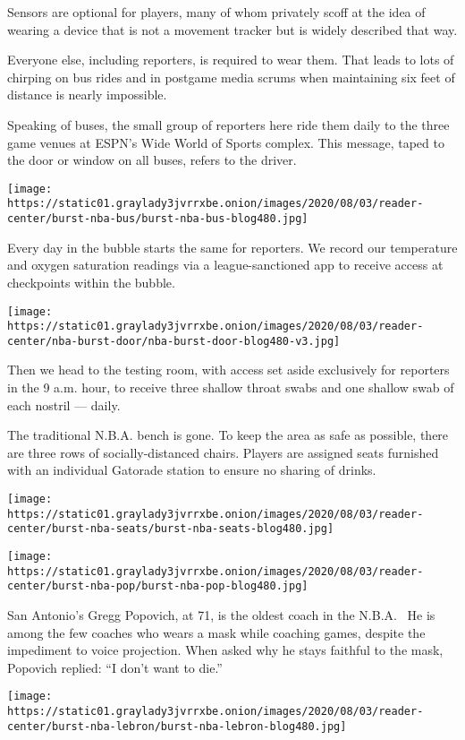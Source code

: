 Sensors are optional for players, many of whom privately scoff at the
idea of wearing a device that is not a movement tracker but is widely
described that way.

 Everyone else, including reporters, is required to wear them. That
leads to lots of chirping on bus rides and in postgame media scrums when
maintaining six feet of distance is nearly impossible.~

Speaking of buses, the small group of reporters here ride them daily to
the three game venues at ESPN's Wide World of Sports complex. This
message, taped to the door or window on all buses, refers to the driver.

\texttt{[image: https://static01.graylady3jvrrxbe.onion/images/2020/08/03/reader-center/burst-nba-bus/burst-nba-bus-blog480.jpg]}

Every day in the bubble starts the same for reporters. We record our
temperature and oxygen saturation readings via a league-sanctioned app
to receive access at checkpoints within the bubble.

\texttt{[image: https://static01.graylady3jvrrxbe.onion/images/2020/08/03/reader-center/nba-burst-door/nba-burst-door-blog480-v3.jpg]}

Then we head to the testing room, with access set aside exclusively for
reporters in the 9 a.m. hour, to receive three shallow throat swabs and
one shallow swab of each nostril --- daily.

The traditional N.B.A. bench is gone. To keep the area as safe as
possible, there are three rows of socially-distanced chairs. Players are
assigned seats furnished with an individual Gatorade station to ensure
no sharing of drinks.

\texttt{[image: https://static01.graylady3jvrrxbe.onion/images/2020/08/03/reader-center/burst-nba-seats/burst-nba-seats-blog480.jpg]}

\texttt{[image: https://static01.graylady3jvrrxbe.onion/images/2020/08/03/reader-center/burst-nba-pop/burst-nba-pop-blog480.jpg]}

San Antonio's Gregg Popovich, at 71, is the oldest coach in the N.B.A.~
He is among the few coaches who wears a mask while coaching games,
despite the impediment to voice projection. When asked why he stays
faithful to the mask, Popovich replied: ``I don't want to die.''

\texttt{[image: https://static01.graylady3jvrrxbe.onion/images/2020/08/03/reader-center/burst-nba-lebron/burst-nba-lebron-blog480.jpg]}

